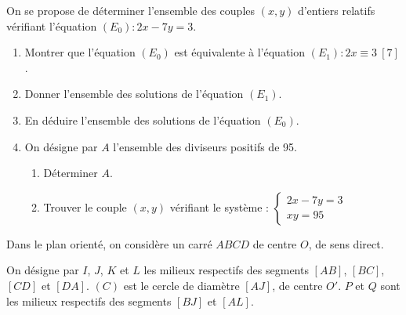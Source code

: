 \documentclass[11pt]{article}
\begin{document}


On se propose de déterminer l'ensemble des couples $(x, y)$ d'entiers relatifs vérifiant l'équation $(E_0) : 2x - 7y = 3$.

\begin{enumerate}
  \item Montrer que l'équation $(E_0)$ est équivalente à l'équation $(E_1) : 2x \equiv 3\ [7]$.
  \item Donner l'ensemble des solutions de l'équation $(E_1)$.
  \item En déduire l'ensemble des solutions de l'équation $(E_0)$.
  \item On désigne par $A$ l'ensemble des diviseurs positifs de 95.
  \begin{enumerate}[label=\alph*.]
    \item Déterminer $A$.
    \item Trouver le couple $(x, y)$ vérifiant le système : $\begin{cases} 2x - 7y = 3 \\ xy = 95 \end{cases}$
  \end{enumerate}
\end{enumerate}


Dans le plan orienté, on considère un carré $ABCD$ de centre $O$, de sens direct.

On désigne par $I$, $J$, $K$ et $L$ les milieux respectifs des segments $[AB]$, $[BC]$, $[CD]$ et $[DA]$. $(C)$ est le cercle de diamètre $[AJ]$, de centre $O'$. $P$ et $Q$ sont les milieux respectifs des segments $[BJ]$ et $[AL]$.
\end{document}
